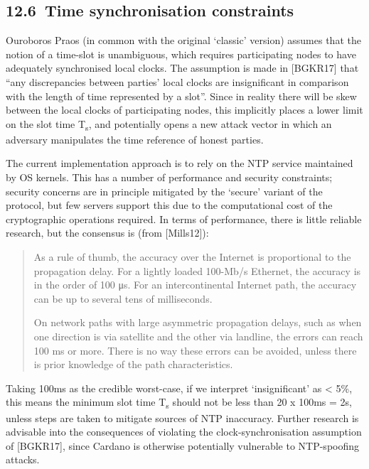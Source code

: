 \documentclass[11pt,a4paper]{article}
\begin{document}
\hypertarget{time-synchronisation-constraints}{%
\subsection{​12.6​~Time synchronisation
constraints}\label{time-synchronisation-constraints}}

Ouroboros Praos (in common with the original `classic' version) assumes
that the notion of a time-slot is unambiguous, which requires
participating nodes to have adequately synchronised local clocks. The
assumption is made in {[}BGKR17{]} that ``any discrepancies between
parties' local clocks are insignificant in comparison with the length of
time represented by a slot''. Since in reality there will be skew
between the local clocks of participating nodes, this implicitly places
a lower limit on the slot time T\textsubscript{s}, and potentially opens
a new attack vector in which an adversary manipulates the time reference
of honest parties.

The current implementation approach is to rely on the NTP service
maintained by OS kernels. This has a number of performance and security
constraints; security concerns are in principle mitigated by the
`secure' variant of the protocol, but few servers support this due to
the computational cost of the cryptographic operations required. In
terms of performance, there is little reliable research, but the
consensus is (from {[}Mills12{]}):

\begin{quote}
As a rule of thumb, the accuracy over the Internet is proportional to
the propagation delay. For a lightly loaded 100-Mb/s Ethernet, the
accuracy is in the order of 100 μs. For an intercontinental Internet
path, the accuracy can be up to several tens of milliseconds.

On network paths with large asymmetric propagation delays, such as when
one direction is via satellite and the other via landline, the errors
can reach 100 ms or more. There is no way these errors can be avoided,
unless there is prior knowledge of the path characteristics.
\end{quote}

Taking 100ms as the credible worst-case, if we interpret `insignificant'
as \textless{} 5\%, this means the minimum slot time T\textsubscript{s}
should not be less than 20 x 100ms = 2s, unless steps are taken to
mitigate sources of NTP inaccuracy. Further research is advisable into
the consequences of violating the clock-synchronisation assumption of
{[}BGKR17{]}, since Cardano is otherwise potentially vulnerable to
NTP-spoofing attacks.
\end{document}
